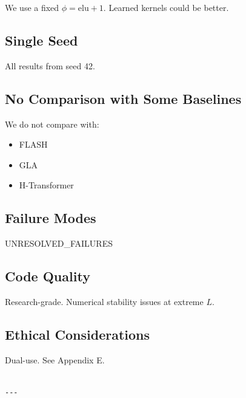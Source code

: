 We use a fixed $\phi = \mathrm{elu} + 1$. Learned kernels could be better.

\subsection{Single Seed}

All results from seed 42.

\subsection{No Comparison with Some Baselines}

We do not compare with:
\begin{itemize}
\item FLASH
\item GLA
\item H-Transformer

\end{itemize}
\subsection{Failure Modes}

{{UNRESOLVED\_FAILURES}}

\subsection{Code Quality}

Research-grade. Numerical stability issues at extreme $L$.

\subsection{Ethical Considerations}

Dual-use. See Appendix E.
\begin{lstlisting}

---
\end{lstlisting}
